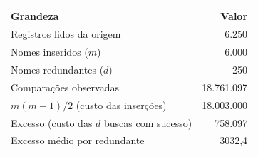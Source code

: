 \begin{tabular}{lr}
\toprule
Grandeza & Valor \\
\midrule
Registros lidos da origem & 6.250 \\
Nomes inseridos ($m$) & 6.000 \\
Nomes redundantes ($d$) & 250 \\
Comparações observadas & 18.761.097 \\
$m(m+1)/2$ (custo das inserções) & 18.003.000 \\
Excesso (custo das $d$ buscas com sucesso) & 758.097 \\
Excesso médio por redundante & 3032,4 \\
\bottomrule
\end{tabular}
